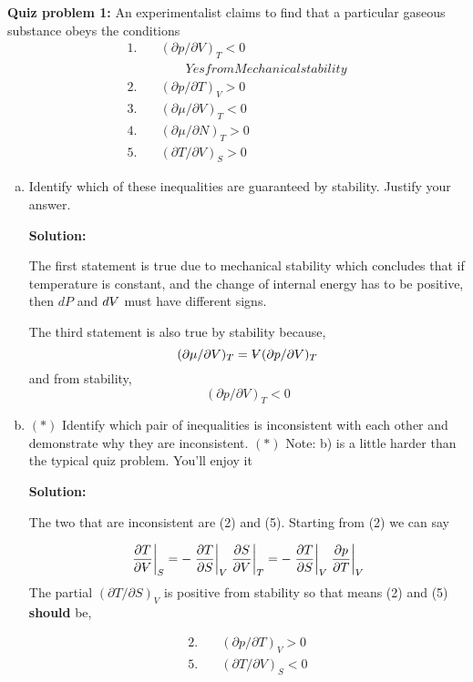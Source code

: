 \documentclass[10pt]{article}
\newenvironment{Solution}
    {\textbf{Solution:}
    
    \vspace{5mm}
    \begin{tcolorbox}
    }
    {
    \end{tcolorbox}
    \vspace{5mm}
    }
\newcommand{\vol}{{\ooalign{\hfil$V$\hfil\cr\kern0.08em--\hfil\cr}}}
\begin{document}
\noindent\textbf{Quiz problem 1:}  
An experimentalist claims to find that a particular gaseous substance obeys the conditions
\begin{align*}
1.\quad& (\partial p / \partial V)_{T}<0 \\
&\qquad Yes from Mechanical stability\\
2.\quad& (\partial p / \partial T)_{V}>0 \\
3.\quad& (\partial \mu / \partial V)_{T}<0 \\
4.\quad& (\partial \mu / \partial N)_{T}>0\\
5.\quad& (\partial T / \partial V)_{S}>0
\end{align*}


\begin{enumerate}[a)]
\item  Identify which of these inequalities are guaranteed by stability. Justify your answer.

\begin{Solution}

The first statement is true due to mechanical stability which concludes that if temperature is constant, and the change of internal energy has to be positive, then $dP$ and $d\vol$ must have different signs.

The third statement is also true by stability because,
\begin{equation}
    (\partial \mu / \partial V)_{T} = \vol (\partial p / \partial V)_{T}
\end{equation}
 and from stability, 
 \begin{equation}
     (\partial p / \partial V)_{T}< 0
 \end{equation}
 
\end{Solution}
\item $(*)$ Identify which pair of inequalities is inconsistent with each other and demonstrate why they are inconsistent.
$(*)$ Note: b) is a little harder than the typical quiz problem. You'll enjoy it

\begin{Solution}
The two that are inconsistent are (2) and (5). Starting from (2) we can say

\begin{equation}
    \left.\frac{\partial T}{\partial\vol}\right|_S = -\left.\frac{\partial T}{\partial S}\right|_V \left.\frac{\partial S}{\partial V}\right|_T = -\left.\frac{\partial T}{\partial S}\right|_V \left.\frac{\partial p}{\partial T}\right|_V
\end{equation}
The partial $(\partial T/\partial S)_V$ is positive from stability so that means (2) and (5) \textbf{should} be,

\begin{align*}
2.\quad& (\partial p / \partial T)_{V}>0 \\
5.\quad& (\partial T / \partial V)_{S}<0
\end{align*}
\end{Solution}

\end{enumerate}
\end{document}
